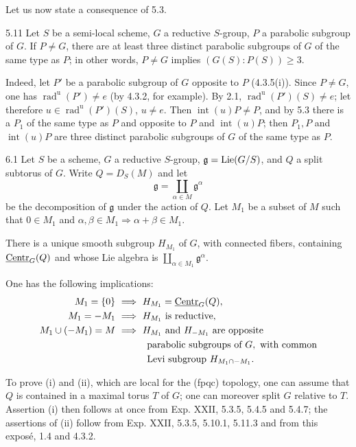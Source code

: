 Let us now state a consequence of 5.3.
\begin{corollary}{5.11}\label{XXVI.5.11}
Let $S$ be a semi-local scheme, $G$ a reductive $S$-group, $P$ a parabolic subgroup of $G$. If $P\neq G$, there are at least three distinct parabolic subgroups of $G$ of the same type as $P$; in other words, $P\neq G$ implies $(G(S):P(S))\geq3$.
\end{corollary}
Indeed, let $P'$ be a parabolic subgroup of $G$ opposite to $P$ (4.3.5(i)). Since $P\neq G$, one has $\operatorname{rad}^{\mathrm u}(P')\neq e$ (by 4.3.2, for example). By 2.1, $\operatorname{rad}^{\mathrm u}(P')(S)\neq e$; let therefore $u\in\operatorname{rad}^{\mathrm u}(P')(S)$, $u\neq e$. Then $\operatorname{int}(u)P\neq P$, and by 5.3 there is a $P_1$ of the same type as $P$ and opposite to $P$ and $\operatorname{int}(u)P$; then $P_1,P$ and $\operatorname{int}(u)P$ are three distinct parabolic subgroups of $G$ of the same type as $P$.

\begin{proposition}{6.1}\label{XXVI.6.1}
Let $S$ be a scheme, $G$ a reductive $S$-group, $\mathfrak g=\operatorname{Lie}(G/S)$, and $Q$ a split subtorus of $G$. Write $Q=D_S(M)$ and let
\[
 \mathfrak g=\coprod_{\alpha\in M}\mathfrak g^\alpha
\]
be the decomposition of $\mathfrak g$ under the action of $Q$. Let $M_1$ be a subset of $M$ such that $0\in M_1$ and $\alpha,\beta\in M_1\Rightarrow\alpha+\beta\in M_1$.
\begin{enumeratei}
\item There is a unique smooth subgroup $H_{M_1}$ of $G$, with connected fibers, containing $\underline{\mathrm{Centr}}_G(Q)$ and whose Lie algebra is $\coprod_{\alpha\in M_1}\mathfrak g^\alpha$.
\item One has the following implications:
\[
\begin{aligned}
 M_1=\{0\}&\ \Longrightarrow\ H_{M_1}=\underline{\mathrm{Centr}}_G(Q),\\
 M_1=-M_1&\ \Longrightarrow\ H_{M_1}\text{ is reductive},\\
 M_1\cup(-M_1)=M&\ \Longrightarrow\ H_{M_1}\text{ and }H_{-M_1}\text{ are opposite}\\
 &\hspace{3.3em}\text{parabolic subgroups of }G,\text{ with common}\\
 &\hspace{3.3em}\text{Levi subgroup }H_{M_1\cap-M_1}.
\end{aligned}
\]
\end{enumeratei}
\end{proposition}
To prove (i) and (ii), which are local for the (fpqc) topology, one can assume that $Q$ is contained in a maximal torus $T$ of $G$; one can moreover split $G$ relative to $T$. Assertion (i) then follows at once from Exp. XXII, 5.3.5, 5.4.5 and 5.4.7; the assertions of (ii) follow from Exp. XXII, 5.3.5, 5.10.1, 5.11.3 and from this exposé, 1.4 and 4.3.2.

